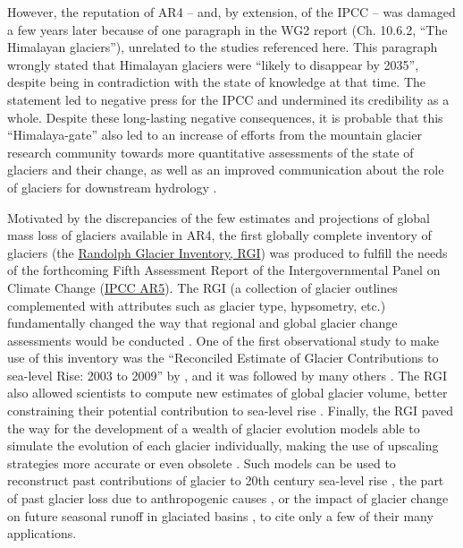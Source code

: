 However, the reputation of AR4 -- and, by extension, of the IPCC -- was damaged a few years later because of one
paragraph in the WG2 report (Ch. 10.6.2, “The Himalayan glaciers”), unrelated to the studies referenced here. This
paragraph wrongly stated that Himalayan glaciers were “likely to disappear by 2035”, despite being in contradiction with
the state of knowledge at that time. The statement led to negative press for the IPCC and undermined its credibility as
a whole. Despite these long-lasting negative consequences, it is probable that this “Himalaya-gate” also led to an
increase of efforts from the mountain glacier research community towards more quantitative assessments of the state of
glaciers and their change, as well as an improved communication about the role of glaciers for downstream hydrology
\citep{Kaser.etal_2010,Radic2010,Radic2011,Bolch2012,Immerzeel2012}.

Motivated by the discrepancies of the few estimates and projections of global mass loss of glaciers available in AR4,
the first globally complete inventory of glaciers (the \href{https://www.glims.org/RGI}{Randolph Glacier Inventory, RGI}) was
produced to fulfill the needs of the forthcoming Fifth Assessment Report of the Intergovernmental Panel on Climate
Change (\href{https://www.ipcc.ch/report/ar5/wg1/}{IPCC AR5}). The RGI (a collection of glacier outlines complemented with
attributes such as glacier type, hypsometry, etc.) fundamentally changed the way that regional and global glacier change
assessments would be conducted \citep{Pfeffer2014}. One of the first observational study to make use of this inventory
was the “Reconciled Estimate of Glacier Contributions to sea-level Rise: 2003 to 2009” by 
\cite{Gardner2013}, and it was followed by many others \citep{Brun2017,Dussaillant2019,Shean2020}. The RGI also allowed
scientists to compute new estimates of global glacier volume, better constraining their potential contribution to
sea-level rise \citep{Huss2012,Grinsted2013}. Finally, the RGI paved the way for the development of a wealth of glacier
evolution models able to simulate the evolution of each glacier individually, making the use of upscaling strategies
more accurate or even obsolete
\citep{Marzeion2012,Giesen2012,Anderson2012,Giesen2013,Hirabayashi2013,Radic2014,Huss2015,Kraaijenbrink2017,Sakai2017,Shannon2019,Rounce2020}. 
Such models can be used to reconstruct past contributions of glacier to 20th century sea-level rise
\citep{Marzeion2015}, the part of past glacier loss due to anthropogenic causes \citep{Marzeion2014}, or the impact of
glacier change on future seasonal runoff in glaciated basins \citep{Bliss2014,Huss2018,Rounce2020b}, to cite only a few
of their many applications.

